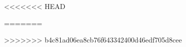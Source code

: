 \usepackage[T1]{fontenc}
\usepackage[utf8]{inputenc}
\usepackage{textgreek}
\usepackage[greek,english]{babel}
\usepackage[activate={true,nocompatibility},final=true,kerning=true,spacing=true,tracking=true,shrink=30,stretch=30,factor=0]{microtype}


<<<<<<< HEAD
\usepackage[oldstylenums]{kpfonts}
=======
\usepackage[upint]{stix}
\usepackage{inconsolata}
>>>>>>> b4c81ad06ea8cb76f643342400d46edf705d8cee
